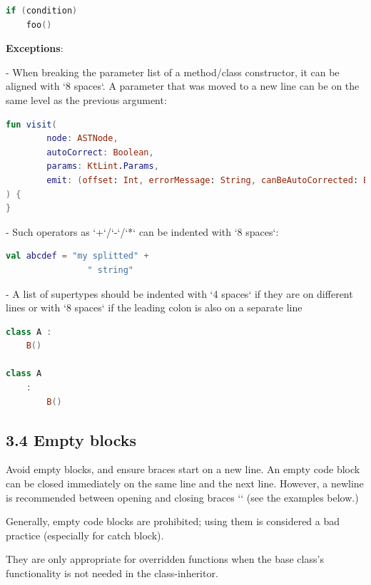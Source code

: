 \begin{lstlisting}[language=Kotlin]
if (condition)
    foo()
\end{lstlisting}


\textbf{Exceptions}: 

- When breaking the parameter list of a method/class constructor, it can be aligned with `8 spaces`. A parameter that was moved to a new line can be on the same level as the previous argument:

    

\begin{lstlisting}[language=Kotlin]
fun visit(
        node: ASTNode,
        autoCorrect: Boolean,
        params: KtLint.Params,
        emit: (offset: Int, errorMessage: String, canBeAutoCorrected: Boolean) -> Unit
) {   
}
\end{lstlisting}
    

- Such operators as `+`/`-`/`*` can be indented with `8 spaces`:

    

\begin{lstlisting}[language=Kotlin]
val abcdef = "my splitted" +
                " string"
\end{lstlisting}
    

- A list of supertypes should be indented with `4 spaces` if they are on different lines or with `8 spaces` if the leading colon is also on a separate line



\begin{lstlisting}[language=Kotlin]
class A :
    B()
    
class A
    :
        B()
\end{lstlisting}


\subsection*{\textbf{3.4 Empty blocks}}



Avoid empty blocks, and ensure braces start on a new line. An empty code block can be closed immediately on the same line and the next line. However, a newline is recommended between opening and closing braces `{}` (see the examples below.)



Generally, empty code blocks are prohibited; using them is considered a bad practice (especially for catch block).

They are only appropriate for overridden functions when the base class's functionality is not needed in the class-inheritor.

